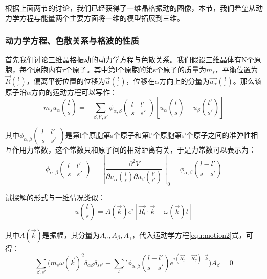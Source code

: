 \documentclass{ctexart}
\begin{document}
            根据上面两节的讨论，我们已经获得了一维晶格振动的图像，本节，我们希望从动力学方程与能量两个主要方面将一维的模型拓展到三维。
            
            \subsubsection{动力学方程、色散关系与格波的性质}
            首先我们讨论三维晶格振动的动力学方程与色散关系。我们假设三维晶体有N个原胞，每个原胞内有r个原子。其中第l个原胞的第s个原子的质量为$m_s$，平衡位置为$\vec{R}\binom{l}{s}$，偏离平衡位置的位移为$\vec{u}\binom{l}{s}$，位移在$\alpha$方向上的分量为$\vec{u_\alpha}\binom{l}{s}$。那么该原子沿$\alpha$方向的运动方程可以写作：
            \begin{equation}\label{equ:motion2}
                m_s\ddot{u_\alpha}\binom{l}{s}=-\sum_{\beta,l',s'}\phi_{\alpha,\beta}\begin{pmatrix}
                l & l'\\
                s & s'
                \end{pmatrix}[u_\alpha\binom{l}{s}-u_\beta\binom{l'}{s'}]
            \end{equation}
            
            其中$\phi_{\alpha,\beta}\begin{pmatrix}
                l & l'\\
                s & s'
                \end{pmatrix}$是第l个原胞第s个原子和第l'个原胞第s'个原子之间的准弹性相互作用力常数，这个常数只和原子间的相对距离有关，于是力常数可以表示为：
                \begin{equation}
                    \phi_{\alpha,\beta}\begin{pmatrix}
                l & l'\\
                s & s'
                \end{pmatrix}=\left[\frac{\partial^2 V}{\partial u_\alpha\binom{l}{s}\partial u_\beta\binom{l'}{s'}}\right]_0=\phi_{\alpha,\beta}\binom{l-l'}{s\quad s'}
                \end{equation}
                
                试探解的形式与一维情况类似：
                \begin{equation}
                    u\binom{l}{s}=A(\vec{k})e^i[\vec{R_l}\cdot \vec{k}-\omega(\vec{k})t]
                \end{equation}
                
                其中$A(\vec{k})$是振幅，其分量为$A_\alpha,A_\beta,A_\gamma$，代入运动学方程\eqref{equ:motion2}式，可得：
                \begin{equation}
                    \sum_{\beta,s'}\Big(m_s\omega(\vec{k})^2\delta_{\alpha\beta}\delta_{ss'}-\sum_l'\phi_{\alpha,\beta}\binom{l-l'}{s\quad s'}e^{i(\vec{R_l}-\vec{R_{l'}})\cdot \vec{k}}\Big)A_\beta=0
                \end{equation}
                
\end{document}
